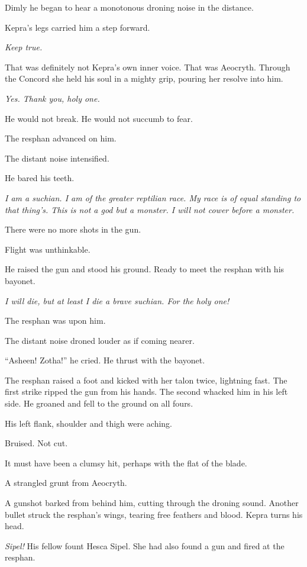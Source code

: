 \documentclass
  [a4paper,
   12pt,
   oneside
  ]%
  {article}
\begin{document}
Dimly he began to hear a monotonous droning noise in the distance.

Kepra's legs carried him a step forward. 

\emph{Keep true.} 

That was definitely not Kepra's own inner voice. 
That was Aeocryth. 
Through the Concord she held his soul in a mighty grip, pouring her resolve into him.

\emph{Yes. Thank you, holy one.}

He would not break.
He would not succumb to fear.

The resphan advanced on him. 

The distant noise intensified.

He bared his teeth.

\emph{%
    I am a suchian. I am of the greater reptilian race. My race is of equal standing to that thing's. This is not a god but a monster. I will not cower before a monster.}

There were no more shots in the gun. 

Flight was unthinkable.

He raised the gun and stood his ground. Ready to meet the resphan with his bayonet. 

\emph{I will die, but at least I die a brave suchian. For the holy one!} 

The resphan was upon him.

The distant noise droned louder as if coming nearer.

``Asheen! Zotha!'' he cried. He thrust with the bayonet.

The resphan raised a foot and kicked with her talon twice, lightning fast. 
The first strike ripped the gun from his hands. 
The second whacked him in his left side. He groaned and fell to the ground on all fours. 

His left flank, shoulder and thigh were aching. 

Bruised. Not cut. 

It must have been a clumsy hit, perhaps with the flat of the blade. 

A strangled grunt from Aeocryth.

A gunshot barked from behind him, cutting through the droning sound. 
Another bullet struck the resphan’s wings, tearing free feathers and blood. 
Kepra turns his head. 

\emph{Sipel!} His fellow fount Hesca Sipel. She had also found a gun and fired at the resphan.
\end{document}
